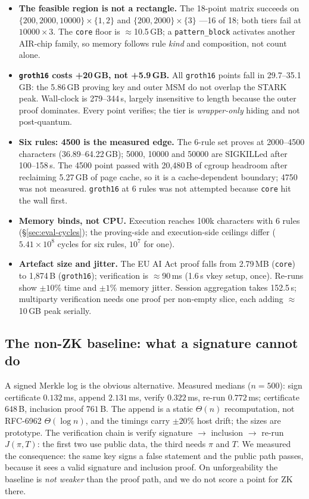\documentclass[10pt,journal,compsoc]{IEEEtran}
\begin{document}
\begin{itemize}
  \item \textbf{The feasible region is not a rectangle.} The 18-point matrix
  succeeds on $\{200,2000,10000\}\times\{1,2\}$ and $\{200,2000\}\times\{3\}$
  ---16 of 18; both tiers fail at $10000\times3$. The \texttt{core} floor is
  $\approx$10.5\,GB; a \texttt{pattern\_block} activates another AIR-chip
  family, so memory follows rule \emph{kind} and composition, not count alone.
  \item \textbf{\texttt{gr\-oth16} costs +20\,GB, not +5.9\,GB.} All
  \texttt{gr\-oth16} points fall in 29.7--35.1\,GB: the 5.86\,GB proving key and
  outer MSM do not overlap the STARK peak. Wall-clock is 279--344\,s, largely
  insensitive to length because the outer proof dominates. Every point
  verifies; the tier is \emph{wrapper-only} hiding and not post-quantum.
  \item \textbf{Six rules: 4500 is the measured edge.} The 6-rule set proves at
  2000--4500 characters (36.89--64.22\,GB); 5000, 10000 and 50000 are SIGKILLed
  after 100--158\,s. The 4500 point passed with 20{,}480\,B of cgroup headroom
  after reclaiming 5.27\,GB of page cache, so it is a cache-dependent boundary;
  4750 was not measured. \texttt{gr\-oth16} at 6 rules was not attempted because
  \texttt{core} hit the wall first.
  \item \textbf{Memory binds, not CPU.} Execution reaches 100k characters with 6
  rules (\S\ref{sec:eval-cycles}); the proving-side and execution-side ceilings
  differ ($5.41\times10^{8}$ cycles for six rules, $10^{7}$ for one).
  \item \textbf{Artefact size and jitter.} The EU AI Act proof falls from
  2.79\,MB (\texttt{core}) to 1{,}874\,B (\texttt{gr\-oth16}); verification is
  $\approx$90\,ms (1.6\,s vkey setup, once). Re-runs show $\pm10\%$ time and
  $\pm1\%$ memory jitter. Session aggregation takes 152.5\,s; multiparty
  verification needs one proof per non-empty slice, each adding $\approx$10\,GB
  peak serially.
\end{itemize}

\subsection{The non-ZK baseline: what a signature cannot do}
\label{sec:eval-baseline}
A signed Merkle log is the obvious alternative. Measured medians ($n=500$):
sign certificate $0.132$\,ms, append $2.131$\,ms, verify $0.322$\,ms, re-run
$0.772$\,ms; certificate $648$\,B, inclusion proof $761$\,B. The append is a
static $\Theta(n)$ recomputation, not RFC-6962 $\Theta(\log n)$, and the
timings carry $\pm20\%$ host drift; the sizes are prototype. The verification
chain is verify signature $\to$ inclusion $\to$ re-run $J(\pi,T)$: the first two
use public data, the third needs $\pi$ and $T$. We measured the consequence:
the same key signs a false statement and the public path passes, because it sees
a valid signature and inclusion proof. On unforgeability the baseline is
\emph{not weaker} than the proof path, and we do not score a point for ZK there.
\end{document}
